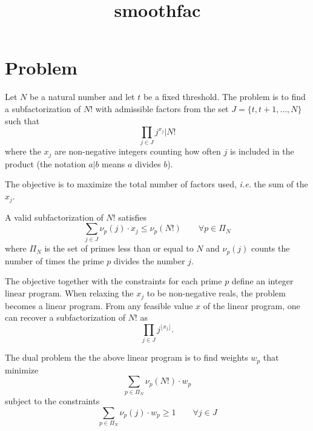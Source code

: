 \documentclass[12pt,a4paper,reqno]{amsart}
\numberwithin{equation}{section}
\begin{document}
\title{smoothfac}

\maketitle


\section{Problem}

Let $N$ be a natural number and let $t$ be a fixed threshold. The problem is
to find a subfactorization of $N!$ with admissible factors from the set $J =
\{ t, t+1, \ldots, N \}$ such that
\begin{equation*}
  \prod_{j \in J} j^{x_j} \Big| N!
\end{equation*}
where the $x_j$ are non-negative integers counting how often $j$ is included
in the product (the notation $a|b$ means $a$ divides $b$).

The objective is to maximize the total number of factors used, \emph{i.e.} the
sum of the $x_j$.

A valid subfactorization of $N!$ satisfies
\begin{equation}
\label{eq:cstr}
  \sum_{j \in J} \nu_p(j) \cdot x_j \leq \nu_p(N!) \qquad \forall p \in \Pi_N
\end{equation}
where $\Pi_N$ is the set of primes less than or equal to $N$ and
$\nu_p(j)$ counts the number of times the prime $p$ divides the number
$j$.

The objective together with the constraints for each prime $p$ define an
integer linear program. When relaxing the $x_j$ to be non-negative reals, the
problem becomes a linear program. From any feasible value $x$ of the linear
program, one can recover a subfactorization of $N!$ as
\begin{equation*}
  \prod_{j \in J} j^{\lfloor x_j \rfloor}.
\end{equation*}

The dual problem the the above linear program is to find weights $w_p$ that
minimize
\begin{equation*}
  \sum_{p \in \Pi_N} \nu_p(N!) \cdot w_p
\end{equation*}
subject to the constraints
\begin{equation}
\label{eq:cstr_dual}
  \sum_{p \in \Pi_N} \nu_p(j) \cdot w_p \geq 1 \qquad \forall j \in J
\end{equation}
\end{document}
